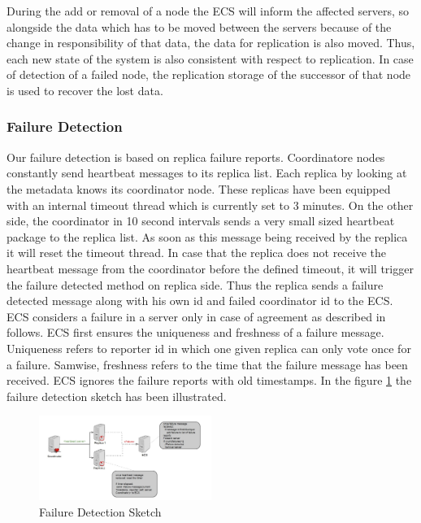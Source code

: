 \documentclass{sig-alternate}
\begin{document}
During the add or removal of a node the ECS will inform the affected servers, so alongside the data which has to be moved between the servers because of the change in responsibility of that data, the data for replication is also moved. Thus, each new state of the system is also consistent with respect to replication. In case of detection of a failed node, the replication storage of the successor of that node is used to recover the lost data. 
\subsubsection{Failure Detection}
Our failure detection is based on replica failure reports. Coordinatore nodes 
constantly send heartbeat messages to its replica list. Each replica by looking at the metadata knows its coordinator node. These replicas have been equipped with an internal timeout thread which is currently set to 3 minutes. On the other side, the coordinator in 10 second intervals sends a very small sized heartbeat package to the replica list. As soon as this message being received by the replica  it will reset the timeout thread. In case that the replica does not receive the heartbeat message from the coordinator before the defined timeout, it will trigger the failure   detected method on replica side. Thus the replica sends a failure detected message along with his own id and failed coordinator id to the ECS. 
ECS considers a failure in a server only in case of agreement as described in follows. ECS first ensures the uniqueness and freshness of a failure message. Uniqueness refers to reporter id in which one given replica can only vote once for a failure. Samwise, freshness refers to the time that the failure message has been received. ECS ignores the failure reports with old timestamps.
In the figure \ref{failuredetection} the failure detection sketch has been illustrated.


\begin{center}
\begin{figure}[ht!]
\centering
     \includegraphics[width=0.5\textwidth]{FailureDetection.jpg}
\caption{Failure Detection Sketch \label{failuredetection}}
\end{figure}
\end{center}
\end{document}
